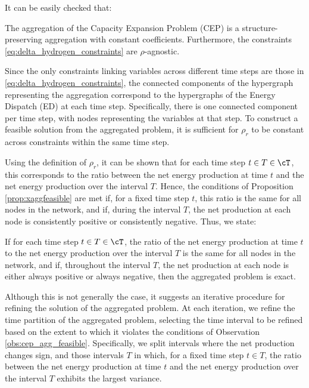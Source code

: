 {It can be easily checked that:

\begin{observation}
  The aggregation of the Capacity Expansion Problem (CEP) is a structure-preserving aggregation with constant coefficients. Furthermore, the constraints \eqref{eq:delta_hydrogen_constraints} are \(\rho\)-agnostic.
\end{observation}

Since the only constraints linking variables across different time steps are those in \eqref{eq:delta_hydrogen_constraints}, the connected components of the hypergraph representing the aggregation correspond to the hypergraphs of the Energy Dispatch (ED) at each time step. Specifically, there is one connected component per time step, with nodes representing the variables at that step. To construct a feasible solution from the aggregated problem, it is sufficient for \(\rho_r\) to be constant across constraints within the same time step.

Using the definition of \(\rho_r\), it can be shown that for each time step \(t \in T \in \cT\), this corresponds to the ratio between the net energy production at time \(t\) and the net energy production over the interval \(T\). Hence, the conditions of Proposition \ref{prop:xaggfeasible} are met if, for a fixed time step \(t\), this ratio is the same for all nodes in the network, and if, during the interval \(T\), the net production at each node is consistently positive or consistently negative. Thus, we state:

\begin{observation}
  \label{obs:cep_agg_feasible}
  If for each time step \(t \in T \in \cT\), the ratio of the net energy production at time \(t\) to the net energy production over the interval \(T\) is the same for all nodes in the network, and if, throughout the interval \(T\), the net production at each node is either always positive or always negative, then the aggregated problem is exact.
\end{observation}

Although this is not generally the case, it suggests an iterative procedure for refining the solution of the aggregated problem. At each iteration, we refine the time partition of the aggregated problem, selecting the time interval to be refined based on the extent to which it violates the conditions of Observation \ref{obs:cep_agg_feasible}. Specifically, we split intervals where the net production changes sign, and those intervals \(T\) in which, for a fixed time step \(t \in T\), the ratio between the net energy production at time \(t\) and the net energy production over the interval \(T\) exhibits the largest variance.

}







